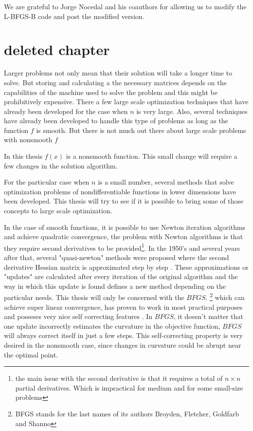 We are grateful to Jorge Nocedal and his coauthors for allowing us 
to modify the L-BFGS-B code and post the modified version.  

\chapter{deleted chapter}

Larger problems not only mean that their solution will take a longer time to solve. But storing and calculating a the necessary matrices depends on the capabilities of the machine used to solve the problem and this might be prohibitively expensive. There a few large scale optimization techniques that have already been developed for the case when $n$ is very large. Also, several techniques have already been developed to handle this type of problems as long as the function $f$ is smooth. But there is not much out there about large scale problems with nonsmooth $f$

In this thesis $f(x)$ is a nonsmooth function. This small change will require a few changes in the solution algorithm.

For the particular case when $n$ is a small number, several methods that solve optimization problems of nondifferentiable functions in lower dimensions \citep{kiwiel85} have been developed. This thesis will try to see if it is possible to bring some of those concepts to large scale optimization. 

In the case of smooth functions, it is possible to use Newton iteration algorithms and achieve quadratic convergence, the problem with Newton algorithms is that they require second derivatives to be provided\footnote{the main issue with the second derivative is that it requires a total of $n \times n$ partial derivatives. Which is impractical for medium and for some small-size problems}. In the 1950's and several years after that, several "quasi-newton" methods were proposed where the second derivative Hessian matrix is approximated step by step \citep{unconstrained}. These approximations or "updates" are calculated after every iteration of the original algorithm and the way in which this update is found defines a new method depending on the particular needs. This thesis will only be concerned with the $BFGS$. \footnote{BFGS stands for the last names of its authors Broyden, Fletcher, Goldfarb and Shanno} which can achieve super linear convergence, has proven to work in most practical purposes and posseses very nice self correcting features \citep{selfcorrecting}. In $BFGS$, it doesn't matter that one update incorrectly estimates the curvature in the objective function, $BFGS$ will always correct itself in just a few steps. This self-correcting property is very desired in the nonsmooth case, since changes in curvature could be abrupt near the optimal point. 

